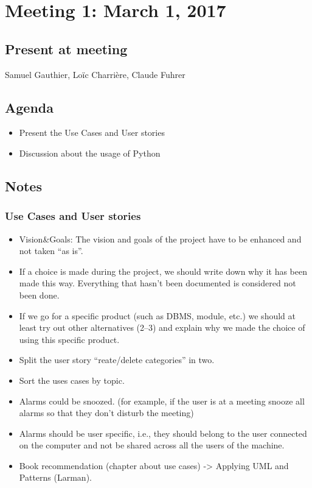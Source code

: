 \section{Meeting 1: March 1, 2017}
\subsection*{Present at meeting}
Samuel Gauthier, Loïc Charrière, Claude Fuhrer
\subsection*{Agenda}
\begin{itemize}
	\item Present  the Use Cases  and User stories
	\item Discussion about the usage of Python
\end{itemize}
\subsection*{Notes}
	\subsubsection{Use Cases and User stories}
	\begin{itemize}
        	\item Vision\&Goals: The vision and goals of the project have to be enhanced and not taken ``as is''.
		\item If a choice is made during the project, we should write down why it has been made this way. Everything that hasn't been documented is considered not been done.
		\item If we go for a specific product (such as DBMS, module, etc.) we should at least try out other alternatives (2--3) and explain why we made the choice of using this specific product.
		\item Split the user story ``reate/delete categories'' in two.
		\item Sort the uses cases by topic.
		\item Alarms could be snoozed. (for example, if the user is at a meeting snooze all alarms so that they don't disturb the meeting) 
		\item Alarms should be user specific, i.e., they should belong to the user connected on the computer and not be shared across all the users of the machine.
		\item Book recommendation (chapter about use cases) -> Applying UML and Patterns (Larman).
	\end{itemize}
